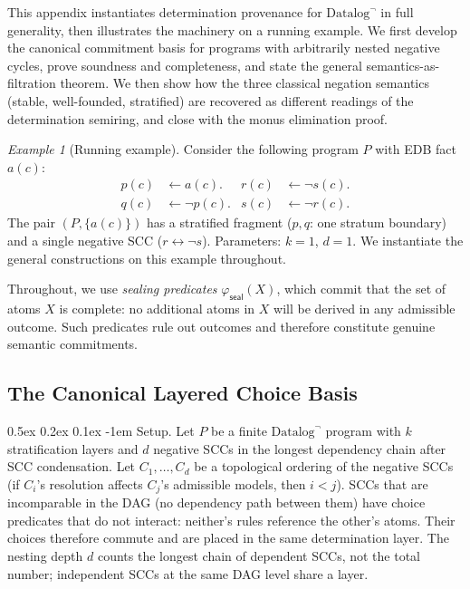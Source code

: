 \documentclass[acmsmall,review,anonymous]{acmart}
\makeatletter
\renewcommand{\paragraph}{\@startsection{paragraph}{4}{\z@}%
  {0.5ex \@plus 0.2ex \@minus 0.1ex}%
  {-1em}%
  {\normalfont\normalsize\bfseries}}
\newcommand{\seal}{\mathsf{seal}}
\theoremstyle{remark}
\newtheorem{example}{Example}
\numberwithin{definition}{section}
\numberwithin{theorem}{section}
\numberwithin{lemma}{section}
\numberwithin{corollary}{section}
\numberwithin{remark}{section}
\numberwithin{example}{section}
\numberwithin{observation}{section}
\numberwithin{assumption}{section}
\makeatother
\begin{document}
This appendix instantiates determination provenance for
$\mbox{Datalog}^\neg$ in full generality, then illustrates the
machinery on a running example.
We first develop the canonical commitment basis for programs with
arbitrarily nested negative cycles, prove soundness and completeness,
and state the general semantics-as-filtration theorem.
We then show how the three classical negation semantics (stable,
well-founded, stratified) are recovered as different readings of the
determination semiring, and close with the monus elimination proof.

\begin{example}[Running example]
  \label{ex:datalog-negation}
  Consider the following program $P$ with EDB fact $a(c)$:
  \begin{align*}
    p(c) & \leftarrow a(c).      & r(c) & \leftarrow \neg s(c). \\[1mm]
    q(c) & \leftarrow \neg p(c). & s(c) & \leftarrow \neg r(c).
  \end{align*}
  The pair $(P, \{a(c)\})$ has a stratified fragment ($p, q$: one
  stratum boundary) and a single negative SCC ($r \leftrightarrow
  \neg s$).
  Parameters: $k = 1$, $d = 1$.
  We instantiate the general constructions on this example throughout.
\end{example}

Throughout, we use \emph{sealing predicates}
$\varphi_{\seal}(X)$, which commit that the set of atoms $X$ is complete:
no additional atoms in $X$ will be derived in any admissible outcome.
Such predicates rule out outcomes and therefore constitute genuine semantic
commitments.

\subsection{The Canonical Layered Choice Basis}
\label{app:datalog-general}

\paragraph{Setup.}
Let $P$ be a finite $\mbox{Datalog}^\neg$ program with $k$
stratification layers and $d$ negative SCCs in the longest dependency
chain after SCC condensation.
Let $C_1, \ldots, C_d$ be a topological ordering of the negative SCCs
(if $C_i$'s resolution affects $C_j$'s admissible models, then
$i < j$).
SCCs that are incomparable in the DAG (no dependency path between them)
have choice predicates that do not interact: neither's rules reference
the other's atoms.
Their choices therefore commute and are placed in the same
determination layer.
The nesting depth $d$ counts the longest chain of dependent SCCs, not
the total number; independent SCCs at the same DAG level share a layer.
\end{document}
